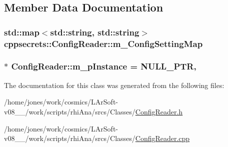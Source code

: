 \subsection{Member Data Documentation}
\hypertarget{classcppsecrets_1_1ConfigReader_a67118401e1d2645dfbb29fdd9cce9839}{
\subsubsection[{m\-\_\-\-Config\-Setting\-Map}]{\setlength{\rightskip}{0pt plus 5cm}std\-::map$<$std\-::string, std\-::string$>$ cppsecrets\-::\-Config\-Reader\-::m\-\_\-\-Config\-Setting\-Map\hspace{0.3cm}{\ttfamily [private]}}}\label{classcppsecrets_1_1ConfigReader_a67118401e1d2645dfbb29fdd9cce9839}
\hypertarget{classcppsecrets_1_1ConfigReader_ad8eb01c06a1c9cf8b63648816394a82e}{
\subsubsection[{m\-\_\-p\-Instance}]{ $\ast$ Config\-Reader\-::m\-\_\-p\-Instance = {\bf N\-U\-L\-L\-\_\-\-P\-T\-R}\hspace{0.3cm}{\ttfamily [static]}, {\ttfamily [private]}}}\label{classcppsecrets_1_1ConfigReader_ad8eb01c06a1c9cf8b63648816394a82e}


The documentation for this class was generated from the following files\-:\begin{DoxyCompactItemize}
\item 
/home/jones/work/cosmics/\-L\-Ar\-Soft-\/v08\-\_\-\_/work/scripts/rhi\-Ana/srcs/\-Classes/\hyperlink{ConfigReader_8h}{Config\-Reader.\-h}\item 
/home/jones/work/cosmics/\-L\-Ar\-Soft-\/v08\-\_\-\_/work/scripts/rhi\-Ana/srcs/\-Classes/\hyperlink{ConfigReader_8cpp}{Config\-Reader.\-cpp}\end{DoxyCompactItemize}
